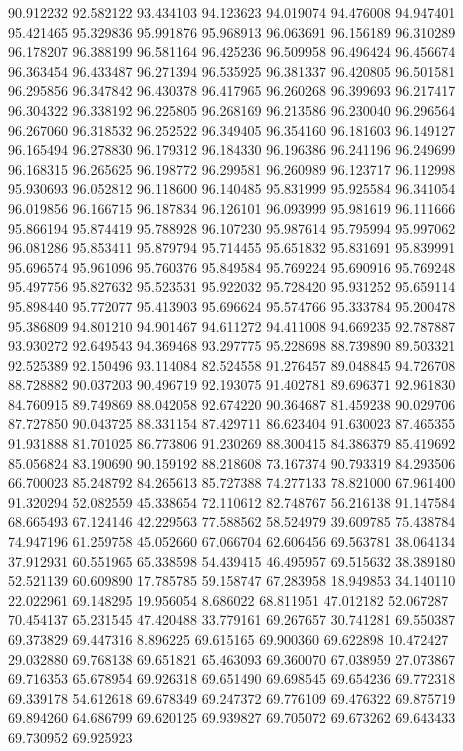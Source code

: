90.912232
92.582122
93.434103
94.123623
94.019074
94.476008
94.947401
95.421465
95.329836
95.991876
95.968913
96.063691
96.156189
96.310289
96.178207
96.388199
96.581164
96.425236
96.509958
96.496424
96.456674
96.363454
96.433487
96.271394
96.535925
96.381337
96.420805
96.501581
96.295856
96.347842
96.430378
96.417965
96.260268
96.399693
96.217417
96.304322
96.338192
96.225805
96.268169
96.213586
96.230040
96.296564
96.267060
96.318532
96.252522
96.349405
96.354160
96.181603
96.149127
96.165494
96.278830
96.179312
96.184330
96.196386
96.241196
96.249699
96.168315
96.265625
96.198772
96.299581
96.260989
96.123717
96.112998
95.930693
96.052812
96.118600
96.140485
95.831999
95.925584
96.341054
96.019856
96.166715
96.187834
96.126101
96.093999
95.981619
96.111666
95.866194
95.874419
95.788928
96.107230
95.987614
95.795994
95.997062
96.081286
95.853411
95.879794
95.714455
95.651832
95.831691
95.839991
95.696574
95.961096
95.760376
95.849584
95.769224
95.690916
95.769248
95.497756
95.827632
95.523531
95.922032
95.728420
95.931252
95.659114
95.898440
95.772077
95.413903
95.696624
95.574766
95.333784
95.200478
95.386809
94.801210
94.901467
94.611272
94.411008
94.669235
92.787887
93.930272
92.649543
94.369468
93.297775
95.228698
88.739890
89.503321
92.525389
92.150496
93.114084
82.524558
91.276457
89.048845
94.726708
88.728882
90.037203
90.496719
92.193075
91.402781
89.696371
92.961830
84.760915
89.749869
88.042058
92.674220
90.364687
81.459238
90.029706
87.727850
90.043725
88.331154
87.429711
86.623404
91.630023
87.465355
91.931888
81.701025
86.773806
91.230269
88.300415
84.386379
85.419692
85.056824
83.190690
90.159192
88.218608
73.167374
90.793319
84.293506
66.700023
85.248792
84.265613
85.727388
74.277133
78.821000
67.961400
91.320294
52.082559
45.338654
72.110612
82.748767
56.216138
91.147584
68.665493
67.124146
42.229563
77.588562
58.524979
39.609785
75.438784
74.947196
61.259758
45.052660
67.066704
62.606456
69.563781
38.064134
37.912931
60.551965
65.338598
54.439415
46.495957
69.515632
38.389180
52.521139
60.609890
17.785785
59.158747
67.283958
18.949853
34.140110
22.022961
69.148295
19.956054
8.686022
68.811951
47.012182
52.067287
70.454137
65.231545
47.420488
33.779161
69.267657
30.741281
69.550387
69.373829
69.447316
8.896225
69.615165
69.900360
69.622898
10.472427
29.032880
69.768138
69.651821
65.463093
69.360070
67.038959
27.073867
69.716353
65.678954
69.926318
69.651490
69.698545
69.654236
69.772318
69.339178
54.612618
69.678349
69.247372
69.776109
69.476322
69.875719
69.894260
64.686799
69.620125
69.939827
69.705072
69.673262
69.643433
69.730952
69.925923
